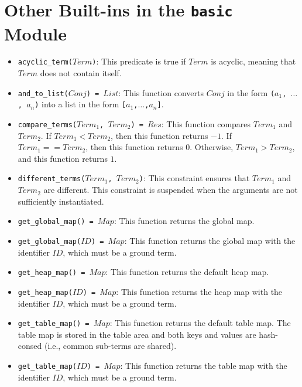 \section{\label{sec:otherbuiltins}Other Built-ins in the \texttt{basic} Module}
\begin{itemize}
\item \texttt{acyclic\_term($Term$)}: This predicate is true if $Term$ is acyclic, meaning that $Term$ does not contain itself.
\item \texttt{and\_to\_list($Conj$) = $List$}: This function converts $Conj$ in the form \texttt{($a_1$, $\ldots$, $a_n$)} into a list in the form \texttt{[$a_1$,$\ldots$,$a_n$]}.
\item \texttt{compare\_terms($Term_1$, $Term_2$) = $Res$}:  This function compares $Term_1$ and \newline $Term_2$.  If $Term_1 < Term_2$, then this function returns $-1$.  If $Term_1 == Term_2$, then this function returns $0$.  Otherwise, $Term_1 > Term_2$, and this function returns $1$.
\item \texttt{different\_terms($Term_1$, $Term_2$)}: This constraint ensures that $Term_1$ and $Term_2$ are different. This constraint is suspended when the arguments are not sufficiently instantiated.
\item \texttt{get\_global\_map() = $Map$}: This function returns the global map.
\item \texttt{get\_global\_map($ID$) = $Map$}: This function returns the global map with the identifier $ID$, which must be a ground term.
\item \texttt{get\_heap\_map() = $Map$}: This function returns the default heap map.
\item \texttt{get\_heap\_map($ID$) = $Map$}: This function returns the heap map with the identifier $ID$, which must be a ground term.  
\item \texttt{get\_table\_map() = $Map$}: This function returns the default table map. The table map is stored in the table area and both keys and values are hash-consed (i.e., common sub-terms are shared).
\item \texttt{get\_table\_map($ID$) = $Map$}: This function returns the table map with the identifier $ID$, which must be a ground term. 

\end{itemize}
